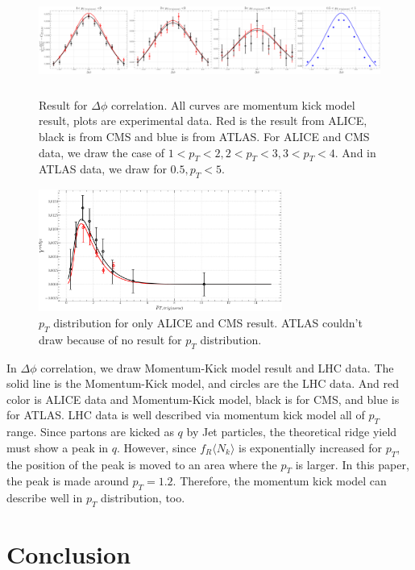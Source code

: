 \documentclass[%
 reprint,
 amsmath,amssymb,
 aps,
]{revtex4-2}
\begin{document}
\begin{figure}[ht]
\centering
\includegraphics[width=16cm, height=3.5cm]{Paper_phiCorr}
\caption{Result for $\Delta \phi$ correlation. All curves are momentum kick model result, plots are experimental data.
Red is the result from ALICE, black is from CMS and blue is from ATLAS.
For ALICE and CMS data, we draw the case of $1<p_T<2, 2<p_T<3, 3<p_T<4$. And in ATLAS data, we draw for $0.5,p_T<5$.}
\label{figure:phicorr}
\end{figure}

\begin{figure}[ht]
\centering
\includegraphics[width=8cm, height=4cm]{Paper_pTdis}
\caption{$p_T$ distribution for only ALICE and CMS result. ATLAS couldn’t draw because of no result for $p_T$ distribution.}
\label{figure:pTdis}
\end{figure}

In $\Delta\phi$ correlation, we draw Momentum-Kick model result and LHC data. 
The solid line is the Momentum-Kick model, and circles are the LHC data. And red color is ALICE data and Momentum-Kick model, 
black is for CMS, and blue is for ATLAS. LHC data is well described via momentum kick model all of $p_T$ range.
Since partons are kicked as $q$ by Jet particles, the theoretical ridge yield must show a peak in $q$. 
However, since $f_R \langle N_k \rangle $ is exponentially increased for $p_T$, the position of the peak is moved to an area where the $p_T$ is larger. 
In this paper, the peak is made around $p_T=1.2$. Therefore, the momentum kick model can describe well in $p_T$ distribution, too.


\section{Conclusion}
\end{document}
